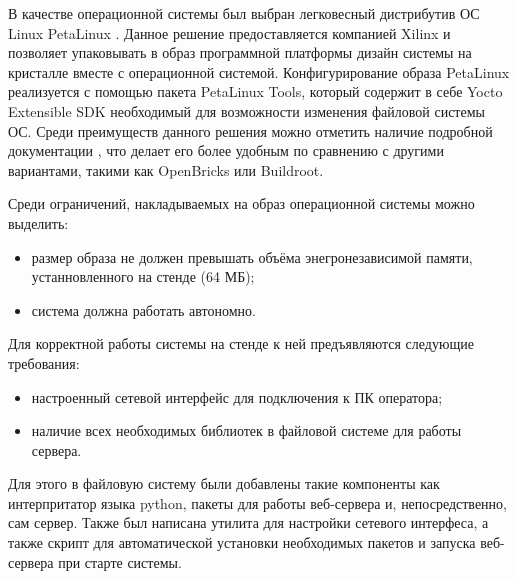В качестве операционной системы был выбран легковесный дистрибутив ОС Linux PetaLinux \parencite{PetaLinuxRG}. Данное решение предоставляется компанией Xilinx и позволяет упаковывать в образ программной платформы дизайн системы на кристалле вместе с операционной системой. Конфигурирование образа PetaLinux реализуется с помощью пакета PetaLinux Tools, который содержит в себе Yocto Extensible SDK необходимый для возможности изменения файловой системы ОС. Среди преимуществ данного решения можно отметить наличие подробной документации \parencite{PetaLinuxWT, PetaLinuxCLRG}, что делает его более удобным по сравнению с другими вариантами, такими как OpenBricks или Buildroot.\par
Среди ограничений, накладываемых на образ операционной системы можно выделить:\par
\begin{itemize}
    \item размер образа не должен превышать объёма энегронезависимой памяти, устанновленного на стенде (64 МБ);
    \item система должна работать автономно.
\end{itemize}\par
Для корректной работы системы на стенде к ней предъявляются следующие требования:\par
\begin{itemize}
    \item настроенный сетевой интерфейс для подключения к ПК оператора;
    \item наличие всех необходимых библиотек в файловой системе для работы сервера.
\end{itemize}\par
Для этого в файловую систему были добавлены такие компоненты как интерпритатор языка python, пакеты для работы веб-сервера и, непосредственно, сам сервер. Также был написана утилита для настройки сетевого интерфеса, а также скрипт для автоматической установки необходимых пакетов и запуска веб-сервера при старте системы.
